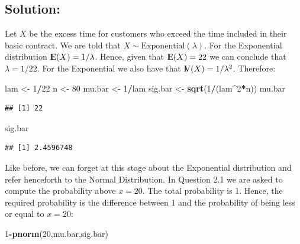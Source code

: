 \documentclass[]{krantz}
\makeatletter
\newenvironment{Shaded}{\begin{snugshade}}{\end{snugshade}}
\newcommand{\DecValTok}[1]{\textcolor[rgb]{0.00,0.00,0.81}{#1}}
\newcommand{\KeywordTok}[1]{\textcolor[rgb]{0.13,0.29,0.53}{\textbf{#1}}}
\newcommand{\NormalTok}[1]{#1}
\newcommand{\OperatorTok}[1]{\textcolor[rgb]{0.81,0.36,0.00}{\textbf{#1}}}
\newcommand{\StringTok}[1]{\textcolor[rgb]{0.31,0.60,0.02}{#1}}
\newcommand{\Expec}{{\rm I\kern-.3em E}}
\newcommand{\Var}{{\rm I\kern-.3em V}}
\newenvironment{kframe}{%
\medskip{}
\setlength{\fboxsep}{.8em}
 \def\at@end@of@kframe{}%
 \ifinner\ifhmode%
  \def\at@end@of@kframe{\end{minipage}}%
  \begin{minipage}{\columnwidth}%
 \fi\fi%
 \def\FrameCommand##1{\hskip\@totalleftmargin \hskip-\fboxsep
 \colorbox{shadecolor}{##1}\hskip-\fboxsep
     \hskip-\linewidth \hskip-\@totalleftmargin \hskip\columnwidth}%
 \MakeFramed {\advance\hsize-\width
   \@totalleftmargin\z@ \linewidth\hsize
   \@setminipage}}%
 {\par\unskip\endMakeFramed%
 \at@end@of@kframe}
\renewenvironment{Shaded}{\begin{kframe}}{\end{kframe}}
\theoremstyle{definition}
\theoremstyle{definition}
\theoremstyle{definition}
\theoremstyle{remark}
\makeatother
\begin{document}
\hypertarget{solution-2}{%
\subsection*{Solution:}\label{solution-2}}


Let \(X\) be the excess time for customers who exceed the time included in
their basic contract. We are told that
\(X \sim \mathrm{Exponential}(\lambda)\). For the Exponential distribution
\(\Expec(X) = 1/\lambda\). Hence, given that \(\Expec(X) = 22\) we can
conclude that \(\lambda = 1/22\). For the Exponential we also have that
\(\Var(X) = 1/\lambda^2\). Therefore:

\begin{Shaded}
\begin{Highlighting}[]
\NormalTok{lam <-}\StringTok{ }\DecValTok{1}\OperatorTok{/}\DecValTok{22}
\NormalTok{n <-}\StringTok{ }\DecValTok{80}
\NormalTok{mu.bar <-}\StringTok{ }\DecValTok{1}\OperatorTok{/}\NormalTok{lam}
\NormalTok{sig.bar <-}\StringTok{ }\KeywordTok{sqrt}\NormalTok{(}\DecValTok{1}\OperatorTok{/}\NormalTok{(lam}\OperatorTok{^}\DecValTok{2}\OperatorTok{*}\NormalTok{n))}
\NormalTok{mu.bar}
\end{Highlighting}
\end{Shaded}

\begin{verbatim}
## [1] 22
\end{verbatim}

\begin{Shaded}
\begin{Highlighting}[]
\NormalTok{sig.bar}
\end{Highlighting}
\end{Shaded}

\begin{verbatim}
## [1] 2.4596748
\end{verbatim}

Like before, we can forget at this stage about the Exponential
distribution and refer henceforth to the Normal Distribution. In
Question 2.1 we are asked to compute the probability above \(x=20\). The
total probability is 1. Hence, the required probability is the
difference between 1 and the probability of being less or equal to
\(x=20\):

\begin{Shaded}
\begin{Highlighting}[]
\DecValTok{1}\OperatorTok{-}\KeywordTok{pnorm}\NormalTok{(}\DecValTok{20}\NormalTok{,mu.bar,sig.bar)}
\end{Highlighting}
\end{Shaded}
\end{document}
